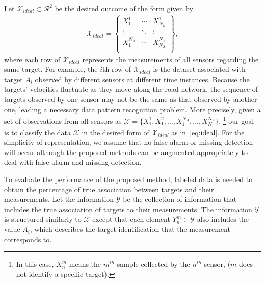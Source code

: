 \documentclass[letterpaper, 10 pt, conference]{ieeeconf}
\begin{document}
Let $\mathcal{X}_{ideal} \subset \mathcal{R}^2$ be the desired outcome of the form given by
\begin{align}\label{eq:ideal}
\mathcal{X}_{ideal}=
\begin{Bmatrix}
X_1^1&\cdots&X_{N_S}^1\\
\vdots&\ddots&\vdots\\
X_1^{N_A}&\cdots&X_{N_S}^{N_A}\\
\end{Bmatrix},
\end{align}
where each row of $\mathcal{X}_{ideal}$ represents the measurements of all sensors regarding the same target. For example, the $i$th row of $\mathcal{X}_{ideal}$ is the dataset associated with target $A_i$ observed by different sensors at different time instances. Because the targets' velocities fluctuate as they move along the road network, the  sequence of targets observed by one sensor may not be the same as that observed by another one, leading a necessary data pattern recognition problem. More precisely, given a set of observations from all sensors as $\mathcal{X} = \{X_1^1, X_1^2,...,X_1^{N_A},...,X_{N_S}^{N_A}\}$, \footnote{In this case, $X_n^m$ means the $m^{th}$ sample collected by the $n^{th}$ sensor, ($m$ does not identify a specific target).} our goal is to classify the data $\mathcal{X}$ in the desired form of $\mathcal{X}_{ideal}$ as in~\eqref{eq:ideal}.
For the simplicity of representation, we assume that no false alarm or missing detection will occur although the proposed methods can be augmented appropriately to deal with false alarm and missing detection.

To evaluate the performance of the proposed method, labeled data is needed to obtain the percentage of true association between targets and their measurements. Let the information $\mathcal{Y}$ be the collection of information that includes the true association of targets to their measurements. The information $\mathcal{Y}$ is structured similarly to $\mathcal{X}$ except that each element $Y_n^m \in \mathcal{Y}$ also includes the value $A_i$, which describes the target identification that the measurement corresponds to.
\end{document}
